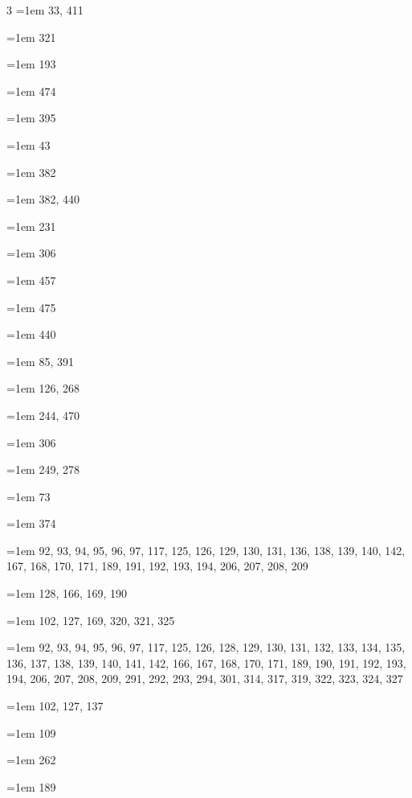 \begin{multicols}{3}
\hangindent=1em  33, 411\par
\hangindent=1em  321\par
\hangindent=1em  193\par
\hangindent=1em  474\par
\hangindent=1em  395\par
\hangindent=1em  43\par
\hangindent=1em  382\par
\hangindent=1em  382, 440\par
\hangindent=1em  231\par
\hangindent=1em  306\par
\hangindent=1em  457\par
\hangindent=1em  475\par
\hangindent=1em  440\par
\hangindent=1em  85, 391\par
\hangindent=1em  126, 268\par
\hangindent=1em  244, 470\par
\hangindent=1em  306\par
\hangindent=1em  249, 278\par
\hangindent=1em  73\par
\hangindent=1em  374\par
\hangindent=1em  92, 93, 94, 95, 96, 97, 117, 125, 126, 129, 130, 131, 136, 138, 139, 140, 142, 167, 168, 170, 171, 189, 191, 192, 193, 194, 206, 207, 208, 209\par
\hangindent=1em  128, 166, 169, 190\par
\hangindent=1em  102, 127, 169, 320, 321, 325\par
\hangindent=1em  92, 93, 94, 95, 96, 97, 117, 125, 126, 128, 129, 130, 131, 132, 133, 134, 135, 136, 137, 138, 139, 140, 141, 142, 166, 167, 168, 170, 171, 189, 190, 191, 192, 193, 194, 206, 207, 208, 209, 291, 292, 293, 294, 301, 314, 317, 319, 322, 323, 324, 327\par
\hangindent=1em  102, 127, 137\par
\hangindent=1em  109\par
\hangindent=1em  262\par
\hangindent=1em  189\par

\end{multicols}
